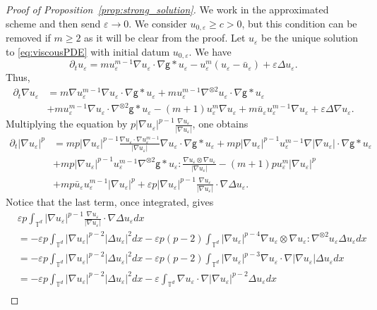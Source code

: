 \documentclass[11pt]{article}
\numberwithin{equation}{section} %
\newcommand{\p}{{\partial}}
\newcommand{\T}{{\mathbb{T}}}
\newcommand{\g}{{\mathsf{g}}}
\newcommand{\D}{\Delta}
\newcommand{\nn}{\nonumber}
\newcommand{\ep}{\varepsilon}
\def \ep{\varepsilon}
\def\nab{\nabla}
\begin{document}
\begin{proof}[Proof of Proposition~\ref{prop:strong_solution}]
We work in the approximated scheme and then send $\varepsilon\to 0$. We consider $u_{0,\ep}\ge c>0$, but this condition can be removed if $m\ge2$ as it will be clear from the proof.  Let $u_\ep$ be the unique solution to \eqref{eq:viscousPDE} with initial datum $u_{0,\ep}$. We have
    \begin{equation*}
        \p_t u_\ep = mu_\ep^{m-1}\nab u_\ep\cdot\nab\g \ast u_\ep - u_\ep^m(u_\ep - \bar u_\ep) + \ep \D u_\ep.
    \end{equation*}
    Thus,
    \begin{align*}
        \p_t \nab u_\ep &= m\nab u_\ep^{m-1}\nab u_\ep\cdot\nab\g \ast u_\ep + mu_\ep^{m-1} \nab^{\otimes 2}u_\ep \cdot\nab\g\ast u_\ep \\
        &+mu_\ep^{m-1}\nab u_\ep\cdot\nab^{\otimes 2}\g\ast u_\ep - (m+1) u_\ep^m \nab u_\ep + m\bar u_\ep u_\ep^{m-1}\nab u_\ep   + \ep \D \nab u_\ep.
    \end{align*}
    Multiplying the equation by $\displaystyle p|\nab u_\ep|^{p-1}\frac{\nab u_\ep}{|\nab u_\ep|}$, one obtains
    \begin{align}\label{dtdxu}
         \p_t |\nab u_\ep |^p &= mp|\nab u_\ep|^{p-1}\frac{\nab u_\ep\cdot \nab u_\ep^{m-1}}{|\nab u_\ep|} \nab u_\ep\cdot\nab \g\ast u_\ep + mp |\nab u_\ep|^{p-1} u_\ep^{m-1} \nab |\nab u_\ep|\cdot \nab\g\ast u_\ep \nn \\
        & + mp|\nab u_\ep|^{p-1} u_\ep^{m-1} \nab^{\otimes 2}\g\ast u_\ep : \frac{\nab u_\ep \otimes \nab u_\ep}{|\nab u_\ep|} - (m+1)pu_\ep^m|\nab u_\ep|^{p} \nn \\
        & + mp\bar u_\ep u_\ep^{m-1} |\nab u_\ep |^p + \ep p|\nab u_\ep|^{p-1}\frac{\nab u_\ep}{|\nab u_\ep |}\cdot \nab \D u_\ep .
    \end{align}
    Notice that the last term, once integrated, gives
    \begin{align*}
    &\ep p \int_{\T^d} |\nab u_\ep|^{p-1}\frac{\nab u_\ep}{|\nab u_\ep |}\cdot \nab \D u_\ep dx \\
    &= -\ep p \int_{\T^d}|\nab u_\ep|^{p-2} |\D u_\ep|^2 dx - \ep p(p-2) \int_{\T^d} |\nab u_\ep|^{p-4} \nab u_\ep\otimes \nab u_\ep : \nab^{\otimes 2}u_\ep   \D u_\ep dx \\
    &=  -\ep p \int_{\T^d}|\nab u_\ep|^{p-2} |\D u_\ep|^2 dx - \ep p(p-2) \int_{\T^d} |\nab u_\ep|^{p-3} \nab u_\ep\cdot \nab |\nab u_\ep|   \D u_\ep dx\\
    &=  -\ep p \int_{\T^d}|\nab u_\ep|^{p-2} |\D u_\ep|^2 dx - \ep  \int_{\T^d}\nab u_\ep\cdot \nab |\nab u_\ep|^{p-2}   \D u_\ep dx \\

\end{align*}
\end{proof}
\end{document}

